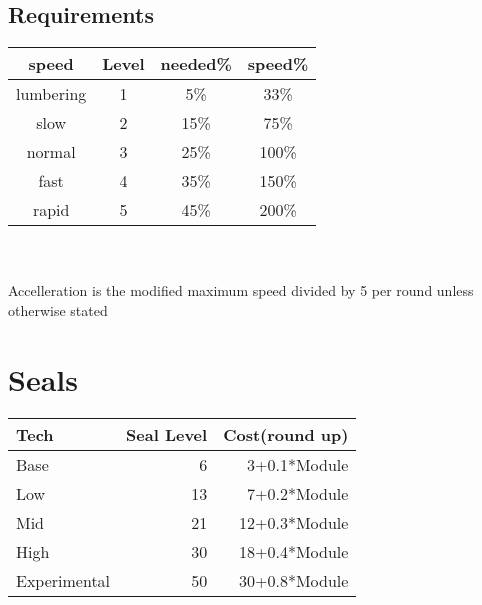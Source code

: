 \subsection{Requirements}\label{subsec:requirements}
\begin{tabular}{c|c|c|c}
    speed       &Level  &needed\%& speed\% \\\hline
    lumbering   &1      &5\%     &33\%\\
    slow        &2      &15\%    &75\%\\
    normal      &3      &25\%    &100\%\\
    fast        &4      &35\%    &150\%\\
    rapid       &5      &45\%    &200\%\\
\end{tabular}\\\newline\\
Accelleration is the modified maximum speed divided by 5 per round unless otherwise stated
\section{Seals}\label{sec:seal-systems}
\begin{tabular}{l|r|r}
    Tech & Seal Level & Cost(round up)\\\hline
    Base &  6 &  3+0.1*Module\\
    Low &   13&  7+0.2*Module\\
    Mid &   21&  12+0.3*Module\\
    High &  30&  18+0.4*Module\\
    Experimental & 50&30+0.8*Module\\
\end{tabular}\\
